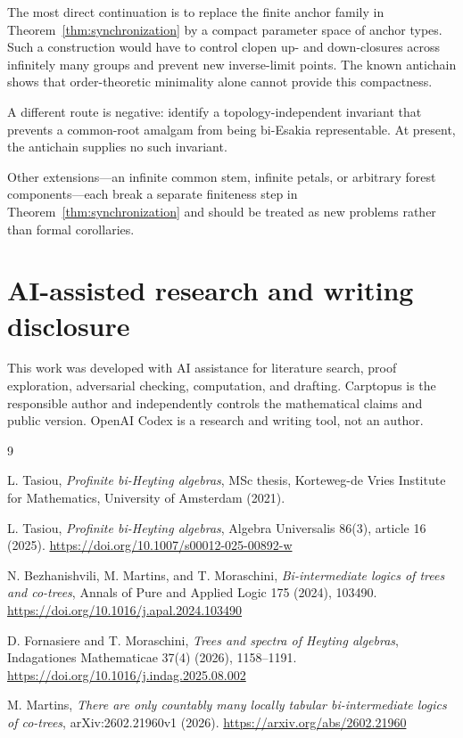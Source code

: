 \documentclass[11pt]{article}
\theoremstyle{remark}
\numberwithin{equation}{section}
\begin{document}
The most direct continuation is to replace the finite anchor family in
Theorem~\ref{thm:synchronization} by a compact parameter space of anchor types.
Such a construction would have to control clopen up- and down-closures across
infinitely many groups and prevent new inverse-limit points. The known
antichain shows that order-theoretic minimality alone cannot provide this
compactness.

A different route is negative: identify a topology-independent invariant that
prevents a common-root amalgam from being bi-Esakia representable. At present,
the antichain supplies no such invariant.

Other extensions---an infinite common stem, infinite petals, or arbitrary
forest components---each break a separate finiteness step in
Theorem~\ref{thm:synchronization} and should be treated as new problems rather
than formal corollaries.

\section{AI-assisted research and writing disclosure}

This work was developed with AI assistance for literature search, proof
exploration, adversarial checking, computation, and drafting. Carptopus is the
responsible author and independently controls the mathematical claims and
public version. OpenAI Codex is a research and writing tool, not an author.

\begingroup
\small
\raggedright
\setlength{\parskip}{0.25em}
\begin{thebibliography}{9}

L. Tasiou,
\emph{Profinite bi-Heyting algebras}, MSc thesis, Korteweg-de Vries Institute
for Mathematics, University of Amsterdam (2021).

L. Tasiou,
\emph{Profinite bi-Heyting algebras}, Algebra Universalis 86(3), article 16
(2025).
\url{https://doi.org/10.1007/s00012-025-00892-w}

N. Bezhanishvili, M. Martins, and T. Moraschini,
\emph{Bi-intermediate logics of trees and co-trees}, Annals of Pure and Applied
Logic 175 (2024), 103490.
\url{https://doi.org/10.1016/j.apal.2024.103490}

D. Fornasiere and T. Moraschini,
\emph{Trees and spectra of Heyting algebras}, Indagationes Mathematicae 37(4)
(2026), 1158--1191.
\url{https://doi.org/10.1016/j.indag.2025.08.002}

M. Martins,
\emph{There are only countably many locally tabular bi-intermediate logics of
co-trees}, arXiv:2602.21960v1 (2026).
\url{https://arxiv.org/abs/2602.21960}

\end{thebibliography}
\endgroup
\end{document}
